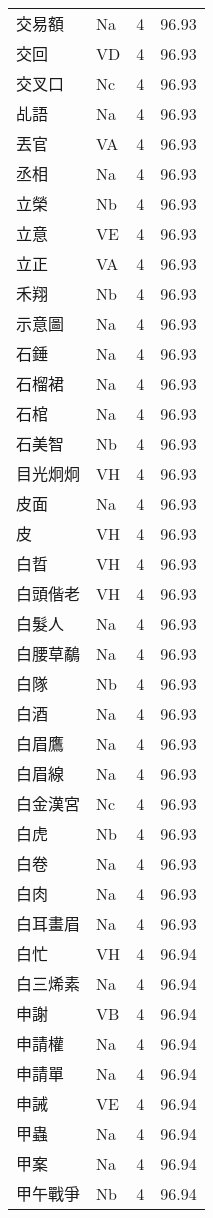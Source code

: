 \documentclass[twocolumn]{book}
\begin{document}
\begin{supertabular}{llrr}
交易額 & Na & 4 &  96.93\\
交回 & VD & 4 &  96.93\\
交叉口 & Nc & 4 &  96.93\\
乩語 & Na & 4 &  96.93\\
丟官 & VA & 4 &  96.93\\
丞相 & Na & 4 &  96.93\\
立榮 & Nb & 4 &  96.93\\
立意 & VE & 4 &  96.93\\
立正 & VA & 4 &  96.93\\
禾翔 & Nb & 4 &  96.93\\
示意圖 & Na & 4 &  96.93\\
石錘 & Na & 4 &  96.93\\
石榴裙 & Na & 4 &  96.93\\
石棺 & Na & 4 &  96.93\\
石美智 & Nb & 4 &  96.93\\
目光炯炯 & VH & 4 &  96.93\\
皮面 & Na & 4 &  96.93\\
皮 & VH & 4 &  96.93\\
白晢 & VH & 4 &  96.93\\
白頭偕老 & VH & 4 &  96.93\\
白髮人 & Na & 4 &  96.93\\
白腰草鷸 & Na & 4 &  96.93\\
白隊 & Nb & 4 &  96.93\\
白酒 & Na & 4 &  96.93\\
白眉鷹 & Na & 4 &  96.93\\
白眉線 & Na & 4 &  96.93\\
白金漢宮 & Nc & 4 &  96.93\\
白虎 & Nb & 4 &  96.93\\
白卷 & Na & 4 &  96.93\\
白肉 & Na & 4 &  96.93\\
白耳畫眉 & Na & 4 &  96.93\\
白忙 & VH & 4 &  96.94\\
白三烯素 & Na & 4 &  96.94\\
申謝 & VB & 4 &  96.94\\
申請權 & Na & 4 &  96.94\\
申請單 & Na & 4 &  96.94\\
申誡 & VE & 4 &  96.94\\
甲蟲 & Na & 4 &  96.94\\
甲案 & Na & 4 &  96.94\\
甲午戰爭 & Nb & 4 &  96.94\\

\end{supertabular}
\end{document}
